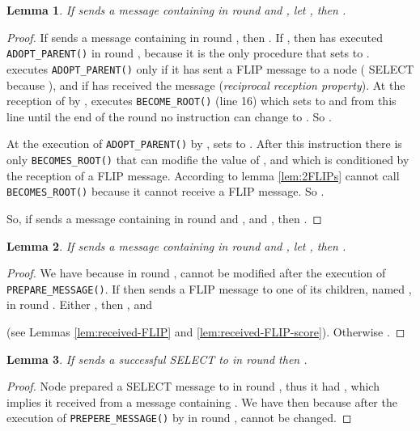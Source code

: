 \documentclass[twocolumn]{article}
\newtheorem{lemma}{Lemma}
\newcommand{\depends}[1]{}
\begin{document}
\begin{lemma}
  \label{lem:send-T-become-N-parent-T}
  If  sends a message containing  in round  and , let , then .
\end{lemma}

\begin{proof}
If  sends a message containing  in round , then . If , then  has executed \texttt{ADOPT\_PARENT()} in round , because it is the only procedure that sets  to .
 executes \texttt{ADOPT\_PARENT()} only if it has sent a FLIP message  to a node  ( SELECT because ), and if  has received the message  (\textit{reciprocal reception property}). At the reception of  by ,  executes \texttt{BECOME\_ROOT()} (line 16) which sets  to  and from this line until the end of the round no instruction can change  to . So .


At the execution of \texttt{ADOPT\_PARENT()} by ,  sets  to . After this instruction there is only \texttt{BECOMES\_ROOT()} that can modifie the value of , and which is conditioned by the reception of a FLIP message. According to lemma \ref{lem:2FLIPs}  cannot call \texttt{BECOMES\_ROOT()} because it cannot receive a FLIP message. So .

So, if  sends a message containing  in round  and , and , then .
 \end{proof}

\begin{lemma}
\label{lem:sendT}
If  sends a message containing 
in round  and , let , then .
\depends{\ref{lem:received-FLIP}, \ref{lem:T-if-T}}
\end{lemma}

\begin{proof}
  We have  because in round ,  cannot be modified after the execution of \texttt{PREPARE\_MESSAGE()}. 
If  
then  sends a FLIP message to one of its children, named , in round .
Either , then ,  and
 
(see Lemmas \ref{lem:received-FLIP} and \ref{lem:received-FLIP-score}).
Otherwise .
 \end{proof}


\begin{lemma}
 \label{lem:selected-was-T}
If  sends a successful SELECT to  in round  then .
\depends{\ref{lem:T-if-T}}
\end{lemma}
\begin{proof}
    Node  prepared a SELECT message to  in round ,
    thus it had , which implies it received from  
    a message containing . We have then  because after the execution of \texttt{PREPERE\_MESSAGE()} by  in round ,  cannot be changed. 
 \end{proof}
\end{document}
